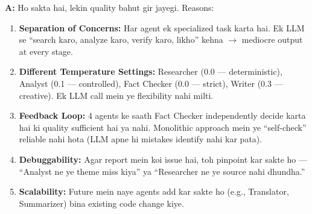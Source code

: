 \documentclass[12pt, a4paper]{article}
\begin{document}
\begin{interviewbox}[title={\faIcon{user-tie} ~Q2: Kyun 4 alag agents use kiye? Ek hi LLM se sab nahi ho sakta?}]
\textbf{A:} Ho sakta hai, lekin quality bahut gir jayegi. Reasons:

\begin{enumerate}
\item \textbf{Separation of Concerns:} Har agent ek specialized task karta hai. Ek LLM se ``search karo, analyze karo, verify karo, likho'' kehna $\rightarrow$ mediocre output at every stage.

\item \textbf{Different Temperature Settings:} Researcher (0.0 --- deterministic), Analyst (0.1 --- controlled), Fact Checker (0.0 --- strict), Writer (0.3 --- creative). Ek LLM call mein ye flexibility nahi milti.

\item \textbf{Feedback Loop:} 4 agents ke saath Fact Checker independently decide karta hai ki quality sufficient hai ya nahi. Monolithic approach mein ye ``self-check'' reliable nahi hota (LLM apne hi mistakes identify nahi kar pata).

\item \textbf{Debuggability:} Agar report mein koi issue hai, toh pinpoint kar sakte ho --- ``Analyst ne ye theme miss kiya'' ya ``Researcher ne ye source nahi dhundha.''

\item \textbf{Scalability:} Future mein naye agents add kar sakte ho (e.g., Translator, Summarizer) bina existing code change kiye.
\end{enumerate}
\end{interviewbox}
\end{document}
